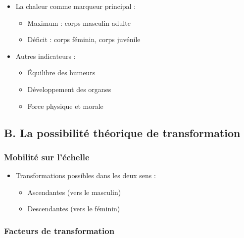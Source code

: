 \documentclass[
  letterpaper,
  DIV=11,
  numbers=noendperiod]{scrreprt}
\providecommand{\tightlist}{%
  \setlength{\itemsep}{0pt}\setlength{\parskip}{0pt}}\usepackage{longtable,booktabs,array}
\begin{document}
\begin{itemize}
\tightlist
\item
  La chaleur comme marqueur principal :

  \begin{itemize}
  \tightlist
  \item
    Maximum : corps masculin adulte
  \item
    Déficit : corps féminin, corps juvénile
  \end{itemize}
\item
  Autres indicateurs :

  \begin{itemize}
  \tightlist
  \item
    Équilibre des humeurs
  \item
    Développement des organes
  \item
    Force physique et morale
  \end{itemize}
\end{itemize}

\subsection{B. La possibilité théorique de
transformation}\label{b.-la-possibilituxe9-thuxe9orique-de-transformation}

\subsubsection{Mobilité sur
l'échelle}\label{mobilituxe9-sur-luxe9chelle}

\begin{itemize}
\tightlist
\item
  Transformations possibles dans les deux sens :

  \begin{itemize}
  \tightlist
  \item
    Ascendantes (vers le masculin)
  \item
    Descendantes (vers le féminin)
  \end{itemize}
\end{itemize}

\subsubsection{Facteurs de
transformation}\label{facteurs-de-transformation}
\end{document}

